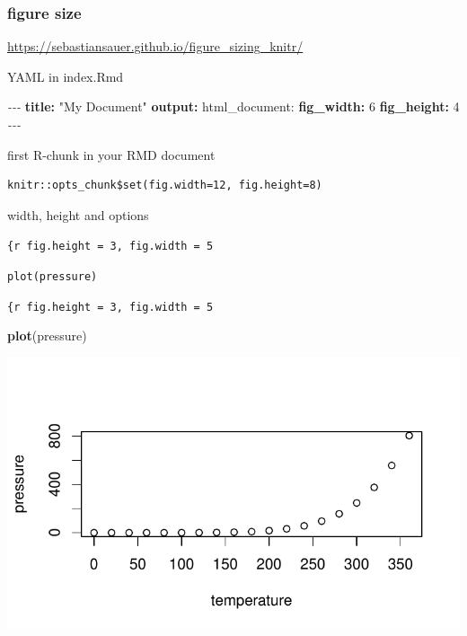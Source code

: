 \documentclass[
]{book}
\newenvironment{Shaded}{\begin{snugshade}}{\end{snugshade}}
\newcommand{\AttributeTok}[1]{\textcolor[rgb]{0.13,0.29,0.53}{#1}}
\newcommand{\DecValTok}[1]{\textcolor[rgb]{0.00,0.00,0.81}{#1}}
\newcommand{\FunctionTok}[1]{\textcolor[rgb]{0.13,0.29,0.53}{\textbf{#1}}}
\newcommand{\KeywordTok}[1]{\textcolor[rgb]{0.13,0.29,0.53}{\textbf{#1}}}
\newcommand{\NormalTok}[1]{#1}
\newcommand{\PreprocessorTok}[1]{\textcolor[rgb]{0.56,0.35,0.01}{\textit{#1}}}
\newcommand{\StringTok}[1]{\textcolor[rgb]{0.31,0.60,0.02}{#1}}
\theoremstyle{definition}
\theoremstyle{definition}
\theoremstyle{definition}
\theoremstyle{definition}
\theoremstyle{remark}
\begin{document}
\hypertarget{figure-size}{%
\subsubsection{figure size}\label{figure-size}}

\url{https://sebastiansauer.github.io/figure_sizing_knitr/}

YAML in index.Rmd

\begin{Shaded}
\begin{Highlighting}[]
\PreprocessorTok{{-}{-}{-} }
\FunctionTok{title}\KeywordTok{:}\AttributeTok{ }\StringTok{"My Document"}\AttributeTok{ }
\FunctionTok{output}\KeywordTok{:}\AttributeTok{ html\_document: }
\FunctionTok{fig\_width}\KeywordTok{:}\AttributeTok{ }\DecValTok{6}\AttributeTok{ }
\FunctionTok{fig\_height}\KeywordTok{:}\AttributeTok{ }\DecValTok{4}\AttributeTok{ }
\PreprocessorTok{{-}{-}{-} }
\end{Highlighting}
\end{Shaded}

first R-chunk in your RMD document

\begin{verbatim}
knitr::opts_chunk$set(fig.width=12, fig.height=8) 
\end{verbatim}

width, height and options

\texttt{\textasciigrave{}\textasciigrave{}\textasciigrave{}\{r\ fig.height\ =\ 3,\ fig.width\ =\ 5}

\texttt{plot(pressure)}

\texttt{\textasciigrave{}\textasciigrave{}\textasciigrave{}}

\texttt{\{r\ fig.height\ =\ 3,\ fig.width\ =\ 5}

\begin{Shaded}
\begin{Highlighting}[]
\FunctionTok{plot}\NormalTok{(pressure)}
\end{Highlighting}
\end{Shaded}

\includegraphics{202401280001-test_files/figure-latex/unnamed-chunk-7-1.pdf}
\end{document}
